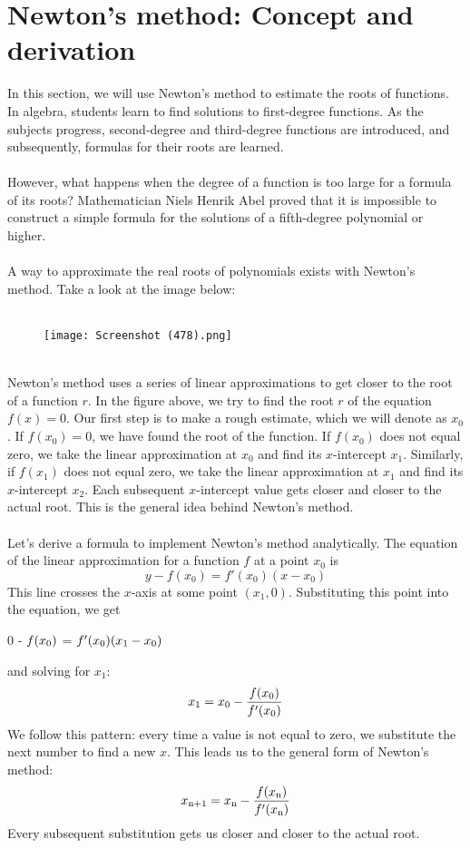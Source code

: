 \documentclass[11pt]{scrartcl}
\begin{document}
\maketitle
\noindent

\section{Newton's method: Concept and derivation}
\noindent
In this section, we will use Newton's method to estimate the roots of functions. In algebra, students learn to find solutions to first-degree functions. As the subjects progress, second-degree and third-degree functions are introduced, and subsequently, formulas for their roots are learned. \\
\\
\noindent 
However, what happens when the degree of a function is too large for a formula of its roots? Mathematician Niels Henrik Abel proved that it is impossible to construct a simple formula for the solutions of a fifth-degree polynomial or higher.\\
\\
\noindent 
A way to approximate the real roots of polynomials exists with Newton's method. Take a look at the image below:\\
\\
\noindent 
\begin{figure}[htp]
    \centering
    \texttt{[image: Screenshot (478).png]}
\end{figure}\\
\noindent
Newton's method uses a series of linear approximations to get closer to the root of a function $r$. In the figure above, we try to find the root $r$ of the equation $f(x)=0$. Our first step is to make a rough estimate, which we will denote as $x_0$. If $f(x_0)=0$, we have found the root of the function. If $f(x_0)$ does not equal zero, we take the linear approximation at $x_0$ and find its $x$-intercept $x_1$. Similarly, if $f(x_1)$ does not equal zero, we take the linear approximation at $x_1$ and find its $x$-intercept $x_2$. Each subsequent $x$-intercept value gets closer and closer to the actual root. This is the general idea behind Newton's method. \\
\\
\noindent
Let's derive a formula to implement Newton's method analytically. The equation of the linear approximation for a function $f$ at a point $x_0$ is 
$$y-f(x_0)=f'(x_0)(x-x_0)$$
This line crosses the $x$-axis at some point $(x_1,0)$. Substituting this point into the equation, we get
\begin{center}
0 - $f(x\textsubscript0)$ = $f'(x\textsubscript0)(x_1-x_0)$
\end{center}
and solving for $x_1$:
$$x\textsubscript1 = x\textsubscript0 - \frac{f(x\textsubscript0)}{f'(x\textsubscript0)}$$
We follow this pattern: every time a value is not equal to zero, we substitute the next number to find a new $x$. This leads us to the general form of Newton's method: 
$$x\textsubscript{n+1} = x\textsubscript{n} - \frac{f(x\textsubscript{n})}{f'(x\textsubscript{n})}$$
Every subsequent substitution gets us closer and closer to the actual root.  
\end{document}
